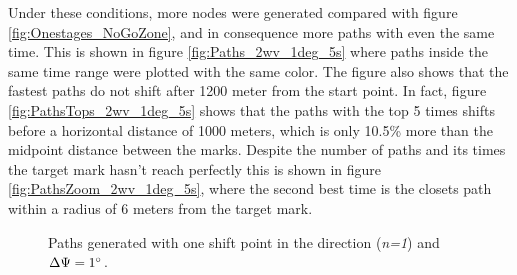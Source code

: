 Under these conditions, more nodes were generated compared with figure \ref{fig:Onestages_NoGoZone}, and in consequence more paths with even the same time. This is shown in figure \ref{fig:Paths_2wv_1deg_5s} where paths inside the same time range were plotted with the same color. The figure also shows that the fastest paths do not shift after 1200 meter from the start point. In fact, figure \ref{fig:PathsTops_2wv_1deg_5s} shows that the paths with the top 5 times shifts before a horizontal distance of 1000 meters, which is only 10.5\% more than the midpoint distance between the marks. Despite the number of paths and its times the target mark hasn't reach perfectly 
this is shown in figure \ref{fig:PathsZoom_2wv_1deg_5s}, where the second best time is the closets path within a radius of 6 meters from the target mark. %
\begin{figure} [hbt!]
  \centering
  \hfill
  \hfill 
  \caption{Paths generated with one shift point in the direction (\textit{n=1}) and $\Delta \Psi =1\degree$.}
\label{fig:Nodes_Paths_2wv_1deg_5s}
\end{figure}

